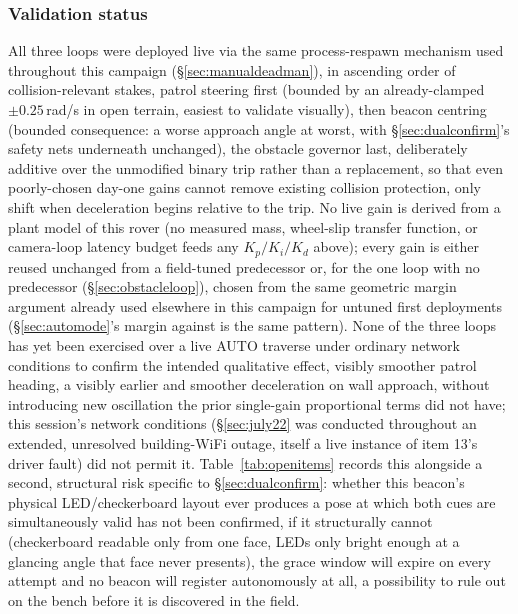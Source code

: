 \subsubsection{Validation status}
\label{sec:pidvalidation}
All three loops were deployed live via the same process-respawn mechanism
used throughout this campaign (\S\ref{sec:manualdeadman}), in ascending
order of collision-relevant stakes, patrol steering first (bounded by an
already-clamped $\pm 0.25$\,rad/s in open terrain, easiest to validate
visually), then beacon centring (bounded consequence: a worse approach
angle at worst, with \S\ref{sec:dualconfirm}'s safety nets underneath
unchanged), the obstacle governor last, deliberately additive over the
unmodified binary trip rather than a replacement, so that even
poorly-chosen day-one gains cannot remove existing collision protection,
only shift when deceleration begins relative to the trip. No live gain is
derived from a plant model of this rover (no measured mass, wheel-slip
transfer function, or camera-loop latency budget feeds any $K_p/K_i/K_d$
above); every gain is either reused unchanged from a field-tuned
predecessor or, for the one loop with no predecessor
(\S\ref{sec:obstacleloop}), chosen from the same geometric margin argument
already used elsewhere in this campaign for untuned first deployments
(\S\ref{sec:automode}'s  margin against
 is the same pattern). None of the three loops has
yet been exercised over a live AUTO traverse under ordinary network
conditions to confirm the intended qualitative effect, visibly smoother
patrol heading, a visibly earlier and smoother deceleration on wall
approach, without introducing new oscillation the prior single-gain
proportional terms did not have; this session's network conditions
(\S\ref{sec:july22} was conducted throughout an extended, unresolved
building-WiFi outage, itself a live instance of item 13's driver fault)
did not permit it. Table~\ref{tab:openitems} records this alongside a
second, structural risk specific to \S\ref{sec:dualconfirm}: whether this
beacon's physical LED/checkerboard layout ever produces a pose at which
both cues are simultaneously valid has not been confirmed, if it
structurally cannot (checkerboard readable only from one face, LEDs only
bright enough at a glancing angle that face never presents), the grace
window will expire on every attempt and no beacon will register
autonomously at all, a possibility to rule out on the bench before it is
discovered in the field.


